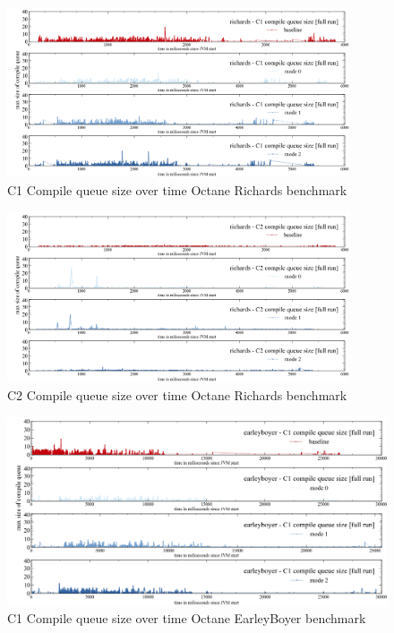 \begin{figure}[ht]
  \begin{center}
    \centering
    \includegraphics[width=0.9\textwidth]{figures/octane_queue_richards_separate_c1.png}
    \caption{C1 Compile queue size over time Octane Richards benchmark}
    \label{f:octane_queue_richards_separate_c1}
  \end{center}
\end{figure}
\begin{figure}[ht]
  \begin{center}
    \centering
    \includegraphics[width=0.9\textwidth]{figures/octane_queue_richards_separate_c2.png}
    \caption{C2 Compile queue size over time Octane Richards benchmark}
    \label{f:octane_queue_richards_separate_c2}
  \end{center}
\end{figure}
\begin{figure}[ht]
  \begin{center}
    \centering
    \includegraphics[width=1.0\textwidth]{figures/octane_queue_earleyboyer_separate_c1.png}
    \caption{C1 Compile queue size over time Octane EarleyBoyer benchmark}
    \label{f:octane_queue_earleyboyer_separate_c1}
  \end{center}
\end{figure}

